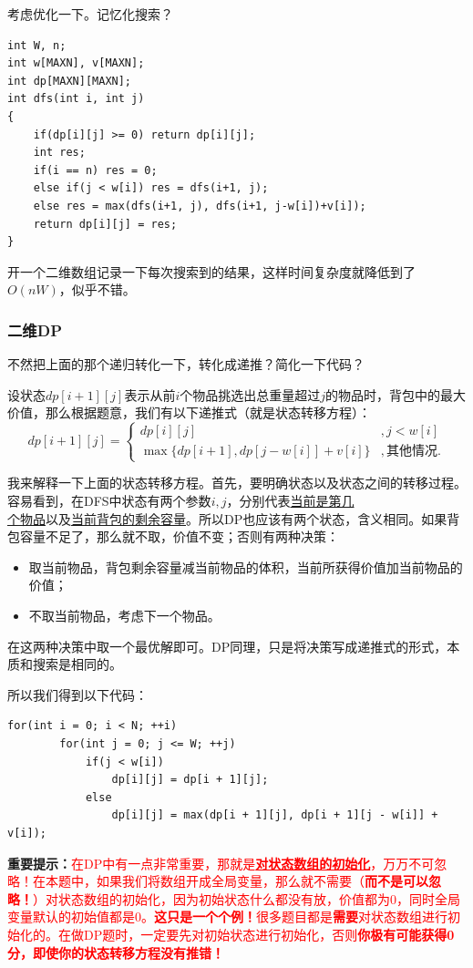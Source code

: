 \documentclass{article}
\theoremstyle{nonumberplain}
\begin{document}
考虑优化一下。记忆化搜索？
\begin{verbatim}
int W, n;    
int w[MAXN], v[MAXN];  
int dp[MAXN][MAXN];  
int dfs(int i, int j)
{  
    if(dp[i][j] >= 0) return dp[i][j];  
    int res;   
    if(i == n) res = 0; 
    else if(j < w[i]) res = dfs(i+1, j);   
    else res = max(dfs(i+1, j), dfs(i+1, j-w[i])+v[i]);  
    return dp[i][j] = res;  
}
\end{verbatim}

开一个二维数组记录一下每次搜索到的结果，这样时间复杂度就降低到了$O(nW)$，似乎不错。
\subsubsection{二维DP}
不然把上面的那个递归转化一下，转化成递推？简化一下代码？

设状态$dp[i+1][j]$表示从前$i$个物品挑选出总重量超过$j$的物品时，背包中的最大价值，那么根据题意，我们有以下递推式（就是状态转移方程）：
\begin{equation*}
	dp[i+1][j]=\begin{cases}
		dp[i][j]                        & ,j<w[i]   \\
		\max\{dp[i+1],dp[j-w[i]]+v[i]\} & ,其他情况.
	\end{cases}
\end{equation*}

我来解释一下上面的状态转移方程。首先，要明确状态以及状态之间的转移过程。容易看到，在DFS中状态有两个参数$i,j$，分别代表\underline{当前是第几}\\\underline{个物品}以及\underline{当前背包的剩余容量}。所以DP也应该有两个状态，含义相同。如果背包容量不足了，那么就不取，价值不变；否则有两种决策：
\begin{itemize}
	\item{取当前物品，背包剩余容量减当前物品的体积，当前所获得价值加当前物品的价值；}
	\item{不取当前物品，考虑下一个物品。}
\end{itemize}

在这两种决策中取一个最优解即可。DP同理，只是将决策写成递推式的形式，本质和搜索是相同的。

所以我们得到以下代码：

\begin{verbatim}
for(int i = 0; i < N; ++i)
        for(int j = 0; j <= W; ++j)
            if(j < w[i])
                dp[i][j] = dp[i + 1][j];
            else
                dp[i][j] = max(dp[i + 1][j], dp[i + 1][j - w[i]] + v[i]);
\end{verbatim}
\textbf{重要提示：}\textcolor{red}{在DP中有一点非常重要，那就是\underline{\textbf{对状态数组的初始化}}，万万不可忽略！在本题中，如果我们将数组开成全局变量，那么就不需要（\textbf{而不是可以忽略！}）对状态数组的初始化，因为初始状态什么都没有放，价值都为0，同时全局变量默认的初始值都是0。\textbf{这只是一个个例！}很多题目都是\textbf{需要}对状态数组进行初始化的。在做DP题时，一定要先对初始状态进行初始化，否则\textbf{你极有可能获得0分，即使你的状态转移方程没有推错！}}
\end{document}
